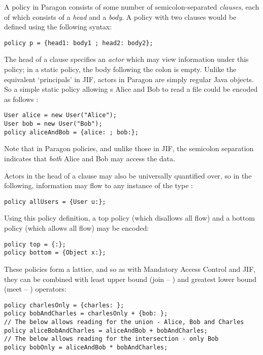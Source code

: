 A policy in Paragon consists of some number of semicolon-separated \textit{clauses}, each of which consists of a \textit{head} and a \textit{body}. A policy  with two clauses would be defined using the following syntax:

\begin{verbatim}
policy p = {head1: body1 ; head2: body2};
\end{verbatim}

The head of a clause specifies an \textit{actor} which may view information under this policy; in a static policy, the body following the colon is empty. Unlike the equivalent `principals' in JIF, actors in Paragon are simply regular Java objects. So a simple static policy allowing s Alice and Bob to read a file could be encoded as follows \cite{broberg2013paragon}:

\begin{verbatim}
User alice = new User("Alice");
User bob = new User("Bob");
policy aliceAndBob = {alice: ; bob:};
\end{verbatim}

Note that in Paragon policies, and unlike those in JIF, the semicolon separation indicates that \textit{both} Alice and Bob may access the data.

Actors in the head of a clause may also be universally quantified over, so in the following, information may flow to any instance of the type :

\begin{verbatim}
policy allUsers = {User u:};
\end{verbatim}

Using this policy definition, a top policy (which disallows all flow) and a bottom policy (which allows all flow) may be encoded:

\begin{verbatim}
policy top = {:};
policy bottom = {Object x:};
\end{verbatim}

These policies form a lattice, and so as with Mandatory Access Control and JIF, they can be combined with least upper bound (join -- \mono{*}) and greatest lower bound (meet -- \mono{+}) operators:

\begin{verbatim}
policy charlesOnly = {charles: };
policy bobAndCharles = charlesOnly + {bob: };
// The below allows reading for the union - Alice, Bob and Charles
policy aliceBobAndCharles = aliceAndBob + bobAndCharles;
// The below allows reading for the intersection - only Bob
policy bobOnly = aliceAndBob * bobAndCharles;
\end{verbatim}


